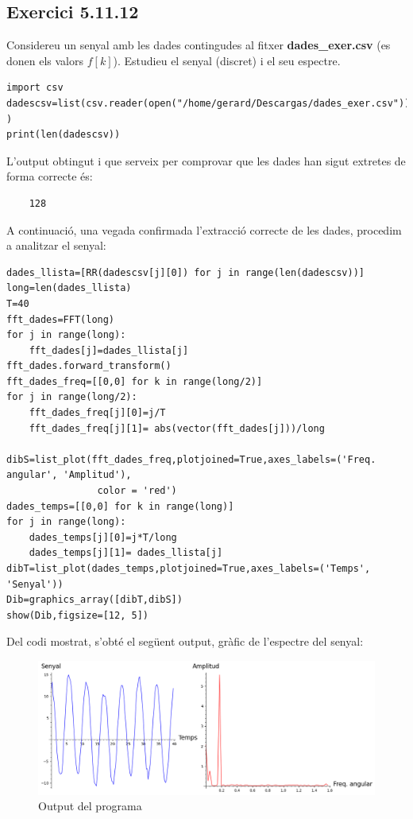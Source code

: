 \documentclass[a4paper, 11pt]{article}
\begin{document}
\subsection{Exercici 5.11.12}
Considereu un senyal amb les dades contingudes al fitxer \textbf{dades\_exer.csv} (es donen els valors $f[k]$). Estudieu el senyal (discret) i el seu espectre.

\begin{verbatim}
import csv
dadescsv=list(csv.reader(open("/home/gerard/Descargas/dades_exer.csv")) )
print(len(dadescsv))
\end{verbatim}
L'output obtingut i que serveix per comprovar que les dades han sigut extretes de forma correcte és:
\begin{verbatim}
    128
\end{verbatim}
A continuació, una vegada confirmada l'extracció correcte de les dades, procedim a analitzar el senyal:
\begin{verbatim}
dades_llista=[RR(dadescsv[j][0]) for j in range(len(dadescsv))]
long=len(dades_llista)
T=40
fft_dades=FFT(long)
for j in range(long):
    fft_dades[j]=dades_llista[j]
fft_dades.forward_transform()
fft_dades_freq=[[0,0] for k in range(long/2)]
for j in range(long/2):
    fft_dades_freq[j][0]=j/T
    fft_dades_freq[j][1]= abs(vector(fft_dades[j]))/long

dibS=list_plot(fft_dades_freq,plotjoined=True,axes_labels=('Freq. angular', 'Amplitud'),
                color = 'red')
dades_temps=[[0,0] for k in range(long)]
for j in range(long):
    dades_temps[j][0]=j*T/long
    dades_temps[j][1]= dades_llista[j]
dibT=list_plot(dades_temps,plotjoined=True,axes_labels=('Temps', 'Senyal'))
Dib=graphics_array([dibT,dibS])
show(Dib,figsize=[12, 5])
\end{verbatim}
Del codi mostrat, s'obté el següent output, gràfic de l'espectre del senyal:
\begin{figure}[h]
    \centering
    \includegraphics[width=1\textwidth]{12.png}
    \caption{Output del programa}
    \label{fig:my_label}
\end{figure}\\
\end{document}
